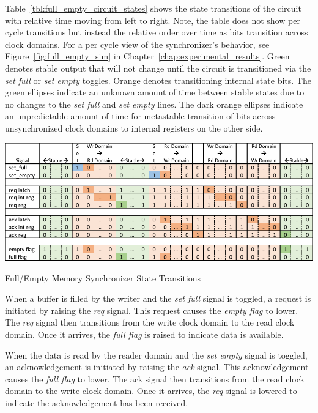         Table~\ref{tbl:full_empty_circuit_states} shows the state transitions of the circuit with relative time moving from left to right. Note, the table does not show per cycle transitions but instead the relative order over time as bits transition across clock domains. For a per cycle view of the synchronizer's behavior, see Figure~\ref{fig:full_empty_sim} in Chapter~\ref{chap:experimental_results}. Green denotes stable output that will not change until the circuit is transitioned via the {\it set full} or {\it set empty} toggles. Orange denotes transitioning internal state bits. The green ellipses indicate an unknown amount of time between stable states due to no changes to the {\it set full} and {\it set empty} lines. The dark orange ellipses indicate an unpredictable amount of time for metastable transition of bits across unsynchronized clock domains to internal registers on the other side.

        \begin{table}
            \centering
            \includegraphics[width=1.0\textwidth]{fig/full_empty_circuit_states.pdf}
            \caption{Full/Empty Memory Synchronizer State Transitions}
            \label{tbl:full_empty_circuit_states}
        \end{table}

        When a buffer is filled by the writer and the {\it set full} signal is toggled, a request is initiated by raising the {\it req} signal. This request causes the {\it empty flag} to lower. The {\it req} signal then transitions from the write clock domain to the read clock domain. Once it arrives, the {\it full flag} is raised to indicate data is available.

        When the data is read by the reader domain and the {\it set empty} signal is toggled, an acknowledgement is initiated by raising the {\it ack} signal. This acknowledgement causes the {\it full flag} to lower. The {ack} signal then transitions from the read clock domain to the write clock domain. Once it arrives, the {\it req} signal is lowered to indicate the acknowledgement has been received.

